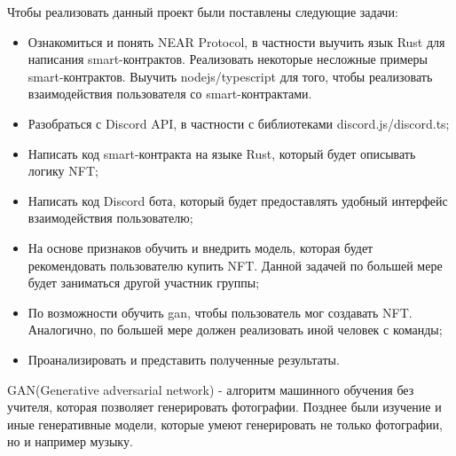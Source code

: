     Чтобы реализовать данный проект были поставлены следующие задачи:
    \begin{itemize}
        \item Ознакомиться и понять NEAR Protocol, в частности выучить язык Rust для написания
        smart-контрактов. Реализовать некоторые несложные примеры smart-контрактов. Выучить nodejs/typescript для того, чтобы реализовать взаимодействия пользователя со smart-контрактами.
        \item Разобраться с Discord API, в частности с библиотеками discord.js/discord.ts;
        \item Написать код smart-контракта на языке Rust, который будет описывать логику NFT;
        \item Написать код Discord бота, который будет предоставлять удобный интерфейс взаимодействия пользователю;
        \item На основе признаков обучить и внедрить модель, которая будет рекомендовать пользователю купить NFT. Данной задачей по большей мере будет заниматься другой участник группы;
        \item По возможности обучить gan, чтобы пользователь мог создавать NFT. Аналогично, по большей мере должен реализовать иной человек с команды;
        \item Проанализировать и представить полученные результаты.
    \end{itemize}
    \begin{definition}
        GAN(Generative adversarial network) - алгоритм машинного обучения без учителя, которая позволяет генерировать фотографии. Позднее были изучение и иные генеративные модели, которые умеют генерировать не только фотографии, но и например музыку.
    \end{definition}